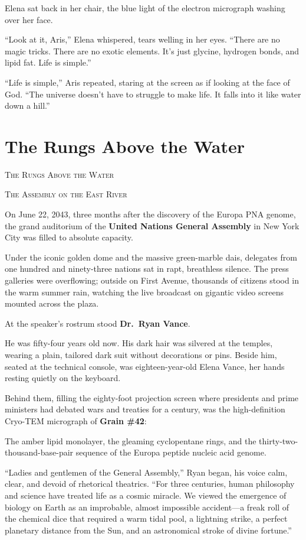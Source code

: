 \documentclass[12pt,twoside,openright]{book}
\newcommand{\sceneheader}[1]{%
  \par\vspace{1.8em}%
  {\noindent\centering\scshape\large #1\par}%
  \vspace{1.0em}%
  \noindent%
}
\begin{document}
Elena sat back in her chair, the blue light of the electron micrograph
washing over her face.

``Look at it, Aris,'' Elena whispered, tears welling in her eyes.
``There are no magic tricks. There are no exotic elements. It's just
glycine, hydrogen bonds, and lipid fat. Life is simple.''

``Life is simple,'' Aris repeated, staring at the screen as if looking
at the face of God. ``The universe doesn't have to struggle to make
life. It falls into it like water down a hill.''

\chapter{The Rungs Above the Water}
\sceneheader{The Rungs Above the Water}

\sceneheader{The Assembly on the East
River}

On June 22, 2043, three months after the discovery of the Europa PNA
genome, the grand auditorium of the \textbf{United Nations General
Assembly} in New York City was filled to absolute capacity.

Under the iconic golden dome and the massive green-marble dais,
delegates from one hundred and ninety-three nations sat in rapt,
breathless silence. The press galleries were overflowing; outside on
First Avenue, thousands of citizens stood in the warm summer rain,
watching the live broadcast on gigantic video screens mounted across the
plaza.

At the speaker's rostrum stood \textbf{Dr.~Ryan Vance}.

He was fifty-four years old now. His dark hair was silvered at the
temples, wearing a plain, tailored dark suit without decorations or
pins. Beside him, seated at the technical console, was eighteen-year-old
Elena Vance, her hands resting quietly on the keyboard.

Behind them, filling the eighty-foot projection screen where presidents
and prime ministers had debated wars and treaties for a century, was the
high-definition Cryo-TEM micrograph of \textbf{Grain \#42}:

The amber lipid monolayer, the gleaming cyclopentane rings, and the
thirty-two-thousand-base-pair sequence of the Europa peptide nucleic
acid genome.

``Ladies and gentlemen of the General Assembly,'' Ryan began, his voice
calm, clear, and devoid of rhetorical theatrics. ``For three centuries,
human philosophy and science have treated life as a cosmic miracle. We
viewed the emergence of biology on Earth as an improbable, almost
impossible accident---a freak roll of the chemical dice that required a
warm tidal pool, a lightning strike, a perfect planetary distance from
the Sun, and an astronomical stroke of divine fortune.''
\end{document}

